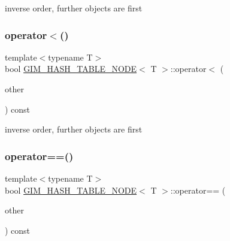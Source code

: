 inverse order, further objects are first \mbox{\label{structGIM__HASH__TABLE__NODE_a79caf0e810ef6bf7acb17453fa60e2fc}} 
\subsubsection{\texorpdfstring{operator$<$()}{operator<()}\hspace{0.1cm}{\footnotesize\ttfamily [2/2]}}
{\footnotesize\ttfamily template$<$typename T$>$ \\
bool \hyperlink{structGIM__HASH__TABLE__NODE}{G\+I\+M\+\_\+\+H\+A\+S\+H\+\_\+\+T\+A\+B\+L\+E\+\_\+\+N\+O\+DE}$<$ T $>$\+::operator$<$ (\begin{DoxyParamCaption}\item[{const \hyperlink{structGIM__HASH__TABLE__NODE}{G\+I\+M\+\_\+\+H\+A\+S\+H\+\_\+\+T\+A\+B\+L\+E\+\_\+\+N\+O\+DE}$<$ T $>$ \&}]{other }\end{DoxyParamCaption}) const\hspace{0.3cm}{\ttfamily [inline]}}

inverse order, further objects are first \mbox{\label{structGIM__HASH__TABLE__NODE_a94b797f611495d4e7661e7d188f61e38}} 
\subsubsection{\texorpdfstring{operator==()}{operator==()}\hspace{0.1cm}{\footnotesize\ttfamily [1/2]}}
{\footnotesize\ttfamily template$<$typename T$>$ \\
bool \hyperlink{structGIM__HASH__TABLE__NODE}{G\+I\+M\+\_\+\+H\+A\+S\+H\+\_\+\+T\+A\+B\+L\+E\+\_\+\+N\+O\+DE}$<$ T $>$\+::operator== (\begin{DoxyParamCaption}\item[{const \hyperlink{structGIM__HASH__TABLE__NODE}{G\+I\+M\+\_\+\+H\+A\+S\+H\+\_\+\+T\+A\+B\+L\+E\+\_\+\+N\+O\+DE}$<$ T $>$ \&}]{other }\end{DoxyParamCaption}) const\hspace{0.3cm}{\ttfamily [inline]}}

